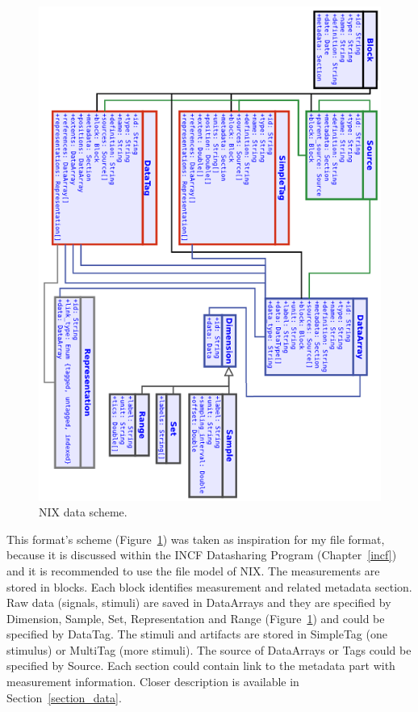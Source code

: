 \begin{figure}
	\begin{center}
		\includegraphics[scale=0.95]{obrazky/NIX_scheme.png}
		\caption{NIX data scheme. \cite{pandora}}
		\label{NIX_scheme}
	\end{center}
\end{figure}

This format's scheme (Figure~\ref{NIX_scheme}) was taken as inspiration for my file format, because it is discussed within the INCF Datasharing Program (Chapter~\ref{incf}) and it is recommended to use the file model of NIX. The measurements are stored in blocks. Each block identifies measurement and related metadata section. Raw data (signals, stimuli) are saved in DataArrays and they are specified by Dimension, Sample, Set, Representation and Range (Figure~\ref{NIX_scheme}) and could be specified by DataTag. The stimuli and artifacts are stored in SimpleTag (one stimulus) or MultiTag (more stimuli). The source of DataArrays or Tags could be specified by Source. Each section could contain link to the metadata part with measurement information. Closer description is available in Section~\ref{section_data}.



